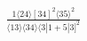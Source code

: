 \documentclass[varwidth, border=5pt]{standalone}
\begin{document}
\begin{my}
$\begin{gathered}
\scriptscriptstyle\frac{1⟨24⟩[34]^2⟨35⟩^2}{⟨13⟩⟨34⟩⟨3|1+5|3]^2}
\end{gathered}$
\end{my}
\end{document}
